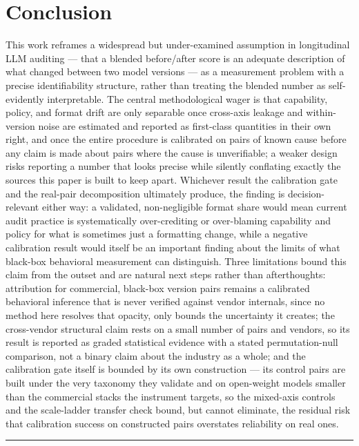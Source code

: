 \documentclass[11pt]{article}
\begin{document}
\section{Conclusion}

This work reframes a widespread but under-examined assumption in longitudinal LLM auditing --- that a blended before/after score is an adequate description of what changed between two model versions --- as a measurement problem with a precise identifiability structure, rather than treating the blended number as self-evidently interpretable. The central methodological wager is that capability, policy, and format drift are only separable once cross-axis leakage and within-version noise are estimated and reported as first-class quantities in their own right, and once the entire procedure is calibrated on pairs of known cause before any claim is made about pairs where the cause is unverifiable; a weaker design risks reporting a number that looks precise while silently conflating exactly the sources this paper is built to keep apart. Whichever result the calibration gate and the real-pair decomposition ultimately produce, the finding is decision-relevant either way: a validated, non-negligible format share would mean current audit practice is systematically over-crediting or over-blaming capability and policy for what is sometimes just a formatting change, while a negative calibration result would itself be an important finding about the limits of what black-box behavioral measurement can distinguish. Three limitations bound this claim from the outset and are natural next steps rather than afterthoughts: attribution for commercial, black-box version pairs remains a calibrated behavioral inference that is never verified against vendor internals, since no method here resolves that opacity, only bounds the uncertainty it creates; the cross-vendor structural claim rests on a small number of pairs and vendors, so its result is reported as graded statistical evidence with a stated permutation-null comparison, not a binary claim about the industry as a whole; and the calibration gate itself is bounded by its own construction --- its control pairs are built under the very taxonomy they validate and on open-weight models smaller than the commercial stacks the instrument targets, so the mixed-axis controls and the scale-ladder transfer check bound, but cannot eliminate, the residual risk that calibration success on constructed pairs overstates reliability on real ones.

\vspace{1em}
\hrule
\vspace{1em}
\end{document}
